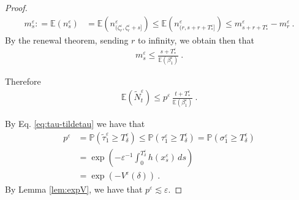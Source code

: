 \documentclass[reqno, 12pt, a4paper]{amsart}
\theoremstyle{plain}
\theoremstyle{definition}
\begin{document}
\begin{proof}
\begin{equation}
\begin{split}
m^\varepsilon_s : = \mathbb E (n_s^\varepsilon) & = \mathbb E \left(n_{\big(\zeta_r^\varepsilon , \zeta_r^\varepsilon + s \big]}^\varepsilon \right) \le \mathbb E \left(n_{(r, s+r+T_*^\varepsilon]}^\varepsilon \right )   \le m^\varepsilon_{s+r+T_*^\varepsilon} - m^\varepsilon_r \ .
\end{split}
\end{equation}
By the renewal theorem, sending $r$ to infinity, we obtain then that
\begin{equation}
\begin{split}
m^\varepsilon_s \le \frac{s+T_*^\varepsilon}{\mathbb E (\beta_1^\varepsilon)} \ .
\end{split}
\end{equation}

\bigskip

Therefore
\begin{equation}
\begin{split}
\mathbb E (\tilde N_t^\varepsilon) \le p^\varepsilon \,  \frac{t+T_*^\varepsilon}{\mathbb E (\beta_1^\varepsilon)} \ .
\end{split}
\end{equation}

\bigskip 

By Eq. \eqref{eq:tau-tildetau} we have that 
\begin{equation}
\begin{split}
p^\varepsilon&= \mathbb P ({\tilde \tau}_1^\varepsilon \ge T^\varepsilon_\delta) \le \mathbb P ({\tau}_1^\varepsilon \ge T^\varepsilon_\delta)=\mathbb P ({\sigma}_1^\varepsilon \ge T^\varepsilon_\delta)\\
& = \exp \left( - \varepsilon^{-1} \int_0^{T_\delta^\varepsilon} h(x_s^\varepsilon) \, ds \right)\\
&= \exp( -V^\varepsilon (\delta) ) \ .
\end{split}
\end{equation}
By Lemma \ref{lem:expV}, we have that $p^\varepsilon \lesssim \varepsilon$.

\bigskip


\end{proof}
\end{document}
